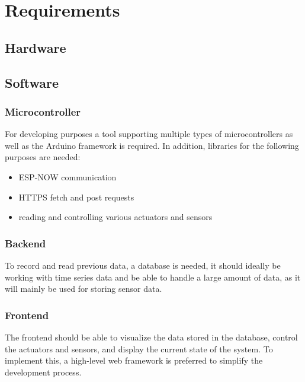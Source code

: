 \chapter{Requirements}
    \section{Hardware}
    \section{Software}
        \subsection{Microcontroller}
        For developing purposes a tool supporting multiple types of microcontrollers
        as well as the Arduino framework is required. In addition, libraries
        for the following purposes are needed:
        \begin{itemize}
            \item ESP-NOW communication
            \item HTTPS fetch and post requests
            \item reading and controlling various actuators and sensors
        \end{itemize}

        \subsection{Backend}
        To record and read previous data, a database is needed, it should ideally be 
        working with time series data and be able to handle a large amount of data, 
        as it will mainly be used for storing sensor data.

        \subsection{Frontend}
        The frontend should be able to visualize the data stored in the database,
        control the actuators and sensors, and display the current state of the 
        system. To implement this, a high-level web framework is preferred to 
        simplify the development process. 